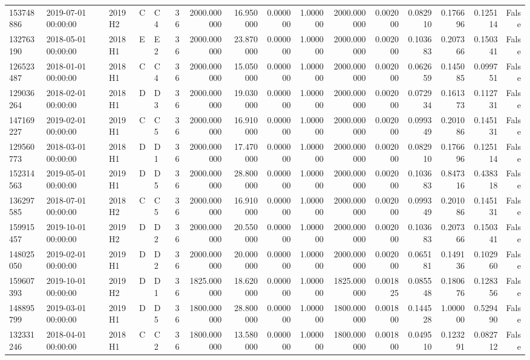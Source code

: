 \begin{tabular}{lllllrrrrrrrrrrr}
153748886 & 2019-07-01 00:00:00 & 2019H2 & C & C4 & 36 & 2000.000000 & 16.950000 & 0.000000 & 1.000000 & 2000.000000 & 0.002000 & 0.082910 & 0.176696 & 0.125114 & False \\
132763190 & 2018-05-01 00:00:00 & 2018H1 & E & E2 & 36 & 2000.000000 & 23.870000 & 0.000000 & 1.000000 & 2000.000000 & 0.002000 & 0.103683 & 0.207366 & 0.150341 & False \\
126523487 & 2018-01-01 00:00:00 & 2018H1 & C & C4 & 36 & 2000.000000 & 15.050000 & 0.000000 & 1.000000 & 2000.000000 & 0.002000 & 0.062659 & 0.145085 & 0.099751 & False \\
129036264 & 2018-02-01 00:00:00 & 2018H1 & D & D3 & 36 & 2000.000000 & 19.030000 & 0.000000 & 1.000000 & 2000.000000 & 0.002000 & 0.072934 & 0.161373 & 0.112731 & False \\
147169227 & 2019-02-01 00:00:00 & 2019H1 & C & C5 & 36 & 2000.000000 & 16.910000 & 0.000000 & 1.000000 & 2000.000000 & 0.002000 & 0.099349 & 0.201086 & 0.145131 & False \\
129560773 & 2018-03-01 00:00:00 & 2018H1 & D & D1 & 36 & 2000.000000 & 17.470000 & 0.000000 & 1.000000 & 2000.000000 & 0.002000 & 0.082910 & 0.176696 & 0.125114 & False \\
152314563 & 2019-05-01 00:00:00 & 2019H1 & D & D5 & 36 & 2000.000000 & 28.800000 & 0.000000 & 1.000000 & 2000.000000 & 0.002000 & 0.103683 & 0.847316 & 0.438318 & False \\
136297585 & 2018-07-01 00:00:00 & 2018H2 & C & C5 & 36 & 2000.000000 & 16.910000 & 0.000000 & 1.000000 & 2000.000000 & 0.002000 & 0.099349 & 0.201086 & 0.145131 & False \\
159915457 & 2019-10-01 00:00:00 & 2019H2 & D & D2 & 36 & 2000.000000 & 20.550000 & 0.000000 & 1.000000 & 2000.000000 & 0.002000 & 0.103683 & 0.207366 & 0.150341 & False \\
148025050 & 2019-02-01 00:00:00 & 2019H1 & D & D2 & 36 & 2000.000000 & 20.000000 & 0.000000 & 1.000000 & 2000.000000 & 0.002000 & 0.065181 & 0.149136 & 0.102960 & False \\
159607393 & 2019-10-01 00:00:00 & 2019H2 & D & D1 & 36 & 1825.000000 & 18.620000 & 0.000000 & 1.000000 & 1825.000000 & 0.001825 & 0.085548 & 0.180676 & 0.128356 & False \\
148895799 & 2019-03-01 00:00:00 & 2019H1 & D & D5 & 36 & 1800.000000 & 28.800000 & 0.000000 & 1.000000 & 1800.000000 & 0.001800 & 0.144528 & 1.000000 & 0.529490 & False \\
132331246 & 2018-04-01 00:00:00 & 2018H1 & C & C2 & 36 & 1800.000000 & 13.580000 & 0.000000 & 1.000000 & 1800.000000 & 0.001800 & 0.049510 & 0.123291 & 0.082712 & False \\

\end{tabular}
